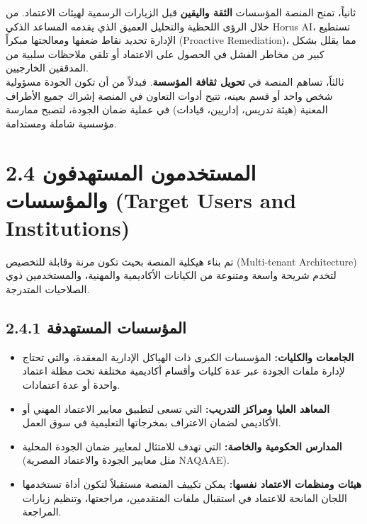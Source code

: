 \documentclass[12pt, a4paper]{report}
\begin{document}
\begin{english}
ثانياً، تمنح المنصة المؤسسات \textbf{الثقة واليقين} قبل الزيارات الرسمية لهيئات الاعتماد. من خلال الرؤى اللحظية والتحليل العميق الذي يقدمه المساعد الذكي Horus AI، تستطيع الإدارة تحديد نقاط ضعفها ومعالجتها مبكراً (Proactive Remediation)، مما يقلل بشكل كبير من مخاطر الفشل في الحصول على الاعتماد أو تلقي ملاحظات سلبية من المدققين الخارجيين. \\

ثالثاً، تساهم المنصة في \textbf{تحويل ثقافة المؤسسة}. فبدلاً من أن تكون الجودة مسؤولية شخص واحد أو قسم بعينه، تتيح أدوات التعاون في المنصة إشراك جميع الأطراف المعنية (هيئة تدريس، إداريين، قيادات) في عملية ضمان الجودة، لتصبح ممارسة مؤسسية شاملة ومستدامة. \\

\section*{2.4 المستخدمون المستهدفون والمؤسسات (Target Users and Institutions)}

تم بناء هيكلية المنصة بحيث تكون مرنة وقابلة للتخصيص (Multi-tenant Architecture) لتخدم شريحة واسعة ومتنوعة من الكيانات الأكاديمية والمهنية، والمستخدمين ذوي الصلاحيات المتدرجة. \\

\subsection*{2.4.1 المؤسسات المستهدفة}
\begin{itemize}
\item \textbf{الجامعات والكليات:} المؤسسات الكبرى ذات الهياكل الإدارية المعقدة، والتي تحتاج لإدارة ملفات الجودة عبر عدة كليات وأقسام أكاديمية مختلفة تحت مظلة اعتماد واحدة أو عدة اعتمادات.
\item \textbf{المعاهد العليا ومراكز التدريب:} التي تسعى لتطبيق معايير الاعتماد المهني أو الأكاديمي لضمان الاعتراف بمخرجاتها التعليمية في سوق العمل.
\item \textbf{المدارس الحكومية والخاصة:} التي تهدف للامتثال لمعايير ضمان الجودة المحلية (مثل معايير الجودة والاعتماد المصرية NAQAAE).
\item \textbf{هيئات ومنظمات الاعتماد نفسها:} يمكن تكييف المنصة مستقبلاً لتكون أداة تستخدمها اللجان المانحة للاعتماد في استقبال ملفات المتقدمين، مراجعتها، وتنظيم زيارات المراجعة.
\end{itemize}


\end{english}
\end{document}
